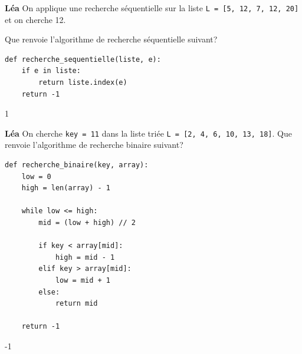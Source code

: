 \begin{Exercice}[5 minutes]\textbf{Léa}
On applique une recherche séquentielle sur la liste \texttt{L = [5, 12, 7, 12, 20]} et on cherche 12.

Que renvoie l’algorithme de recherche séquentielle suivant?

\begin{lstlisting}[style=pythonstyle]
def recherche_sequentielle(liste, e):
    if e in liste:
        return liste.index(e)
    return -1 
\end{lstlisting}


\begin{solution}
1
\end{solution}


\end{Exercice}


\begin{Exercice}[5 minutes]\textbf{Léa}
On cherche \texttt{key = 11} dans la liste triée \texttt{L = [2, 4, 6, 10, 13, 18]}. Que renvoie l'algorithme de recherche binaire suivant?

\begin{lstlisting}[style=pythonstyle]
def recherche_binaire(key, array):
    low = 0
    high = len(array) - 1

    while low <= high:
        mid = (low + high) // 2

        if key < array[mid]:
            high = mid - 1
        elif key > array[mid]:
            low = mid + 1
        else:
            return mid

    return -1
\end{lstlisting}


\begin{solution}
-1
\end{solution}

\end{Exercice}


